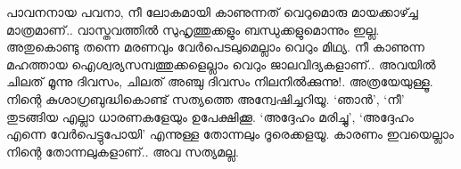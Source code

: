 പാവനനായ പവനാ, നീ ലോകമായി കാണുന്നത് വെറുമൊരു മായക്കാഴ്ച്ച മാത്രമാണ്‌.. വാസ്തവത്തിൽ സുഹൃത്തുക്കളും ബന്ധുക്കളുമൊന്നും ഇല്ല. അതുകൊണ്ടു തന്നെ മരണവും വേർപെടലുമെല്ലാം വെറും മിഥ്യ. നീ കാണുന്ന മഹത്തായ ഐശ്വര്യസമ്പത്തുക്കളെല്ലാം വെറും ജാലവിദ്യകളാണ്‌.. അവയിൽ ചിലത് മൂന്നു ദിവസം, ചിലത് അഞ്ചു ദിവസം നിലനിൽക്കുന്നു!. അത്രയേയുള്ളൂ. നിന്റെ കുശാഗ്രബുദ്ധികൊണ്ട് സത്യത്തെ അന്വേഷിച്ചറിയൂ. ‘ഞാൻ’, ‘നീ’ തുടങ്ങിയ എല്ലാ ധാരണകളേയും ഉപേക്ഷിക്കൂ. ‘അദ്ദേഹം മരിച്ചു’, ‘അദ്ദേഹം എന്നെ വേർപെട്ടുപോയി’ എന്നുള്ള തോന്നലും ദൂരെക്കളയൂ. കാരണം ഇവയെല്ലാം നിന്റെ തോന്നലുകളാണ്‌.. അവ സത്യമല്ല. 
